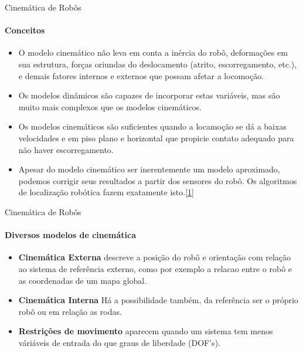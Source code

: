 \documentclass{beamer}
\begin{document}
\begin{frame}{Cinemática de Robôs}
    \framesubtitle{Conceitos}
    \begin{itemize}
        \item O modelo cinemático não leva em conta a inércia do robô, deformações em
              sua estrutura, forças oriundas do deslocamento (atrito, escorregamento, etc.),
              e demais fatores internos e externos que possam afetar a locomoção.
        \item Os modelos dinâmicos são capazes de incorporar estas variáveis, mas são
              muito mais complexos que os modelos cinemáticos.
        \item Os modelos cinemáticos são suficientes quando a locamoção se dá a baixas
              velocidades e em piso plano e horizontal que propicie contato adequado para
              não haver escorregamento.
        \item Apesar do modelo cinemático ser inerentemente um modelo aproximado,
              podemos corrigir seus resultados a partir dos sensores do robô. Os algoritmos
              de localização robótica fazem exatamente isto.\href{http://143.106.148.168:9080/Cursos/IA368N/01-16/cinematica2.pdf}{[1]}
    \end{itemize}
\end{frame}

\begin{frame}{Cinemática de Robôs}
    \framesubtitle{Diversos modelos de cinemática}
    \begin{itemize}
        \item \textbf{Cinemática Externa} descreve a posição do robô e orientação com relação ao sistema de referência externo, como por exemplo a relacao entre o robô e as coordenadas de um mapa global.
        \item \textbf{Cinemática Interna} Há a possibilidade também, da referência ser o próprio robô ou em relação as rodas.
        \item \textbf{Restrições de movimento} aparecem quando um sistema tem menos váriáveis de entrada do que graus de liberdade (DOF's).
    \end{itemize}
\end{frame}


\end{document}
